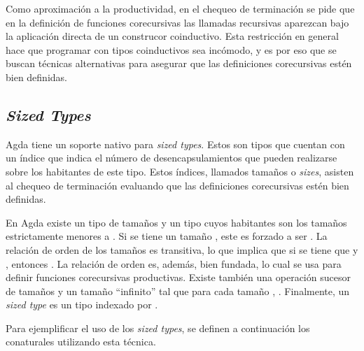 
Como aproximación a la productividad, en el chequeo de terminación se pide que en la definición de funciones corecursivas las llamadas recursivas aparezcan bajo la aplicación directa de un construcor coinductivo. Esta restricción en general hace que programar con tipos coinductivos sea incómodo, y es por eso que se buscan técnicas alternativas para asegurar que las definiciones corecursivas estén bien definidas. 

\subsection{\textit{Sized Types}}

Agda tiene un soporte nativo para \textit{sized types}. Estos son tipos que cuentan con un índice que indica el número de desencapsulamientos que pueden realizarse sobre los habitantes de este tipo. Estos índices, llamados tamaños o \textit{sizes}, asisten al chequeo de terminación evaluando que las definiciones corecursivas estén bien definidas. 

En Agda existe un tipo  de tamaños y un tipo   cuyos habitantes son los tamaños estrictamente menores a . Si se tiene un tamaño  \AgdaSymbol{:}  , este es forzado a ser  \AgdaSymbol{:} . La relación de orden de los tamaños es transitiva, lo que implica que si se tiene que  \AgdaSymbol{:}   y  \AgdaSymbol{:}  , entonces  \AgdaSymbol{:}  . La relación de orden es, además, bien fundada, lo cual se usa para definir funciones corecursivas productivas. Existe también una operación sucesor de tamaños \AgdaFunction{$\uparrow$} y un tamaño ``infinito'' \AgdaArgument{$\infty$} tal que para cada tamaño ,  \AgdaSymbol{:}  \AgdaArgument{$\infty$}. Finalmente, un \textit{sized type} es un tipo indexado por .

Para ejemplificar el uso de los \textit{sized types}, se definen a continuación los conaturales utilizando esta técnica.


